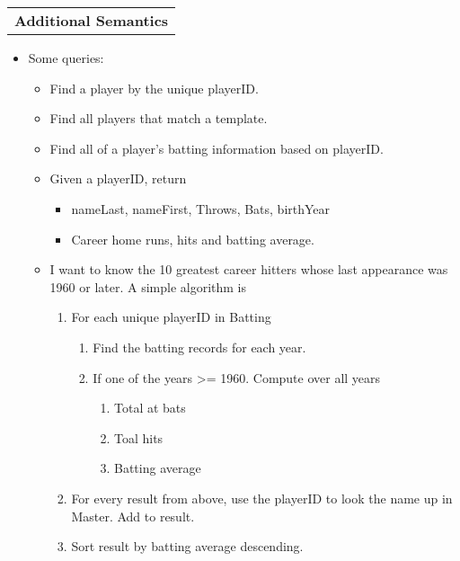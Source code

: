 \documentclass[11pt]{article}
\providecommand{\tightlist}{%
      \setlength{\itemsep}{0pt}\setlength{\parskip}{0pt}}
\begin{document}
\begin{longtable}[]{@{}c@{}}
\toprule
\tabularnewline
\midrule
\endhead
\textbf{Additional Semantics}\tabularnewline
\bottomrule
\end{longtable}

\begin{itemize}
\tightlist
\item
  Some queries:

  \begin{itemize}
  \tightlist
  \item
    Find a player by the unique playerID.
  \item
    Find all players that match a template.
  \item
    Find all of a player's batting information based on playerID.
  \item
    Given a playerID, return

    \begin{itemize}
    \tightlist
    \item
      nameLast, nameFirst, Throws, Bats, birthYear
    \item
      Career home runs, hits and batting average.
    \end{itemize}
  \item
    I want to know the 10 greatest career hitters whose last appearance
    was 1960 or later. A simple algorithm is

    \begin{enumerate}
    \def\labelenumi{\arabic{enumi}.}
    \tightlist
    \item
      For each unique playerID in Batting

      \begin{enumerate}
      \def\labelenumii{\arabic{enumii}.}
      \tightlist
      \item
        Find the batting records for each year.
      \item
        If one of the years \textgreater{}= 1960. Compute over all years

        \begin{enumerate}
        \def\labelenumiii{\arabic{enumiii}.}
        \tightlist
        \item
          Total at bats
        \item
          Toal hits
        \item
          Batting average
        \end{enumerate}
      \end{enumerate}
    \item
      For every result from above, use the playerID to look the name up
      in Master. Add to result.
    \item
      Sort result by batting average descending.
    \end{enumerate}
  \end{itemize}
\end{itemize}
\end{document}
